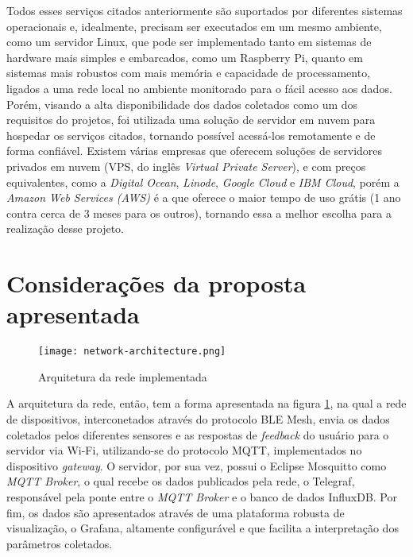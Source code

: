 \documentclass[../monografia.tex]{subfiles}
\begin{document}

Todos esses serviços citados anteriormente são suportados por diferentes sistemas operacionais e, idealmente, precisam ser executados em um mesmo ambiente, como um servidor Linux, que pode ser implementado tanto em sistemas de hardware mais simples e embarcados, como um Raspberry Pi, quanto em sistemas mais robustos com mais memória e capacidade de processamento, ligados a uma rede local no ambiente monitorado para o fácil acesso aos dados. Porém, visando a alta disponibilidade dos dados coletados como um dos requisitos do projetos, foi utilizada uma solução de servidor em nuvem para hospedar os serviços citados, tornando possível acessá-los remotamente e de forma confiável. Existem várias empresas que oferecem soluções de servidores privados em nuvem (VPS, do inglês \textit{Virtual Private Server}), e com preços equivalentes, como a \textit{Digital Ocean}, \textit{Linode}, \textit{Google Cloud} e \textit{IBM Cloud}, porém a \textit{Amazon Web Services (AWS)} é a que oferece o maior tempo de uso grátis (1 ano contra cerca de 3 meses para os outros), tornando essa a melhor escolha para a realização desse projeto. 


\section{Considerações da proposta apresentada}

\begin{figure}[h!]
	\centering
	\texttt{[image: network-architecture.png]}
	\caption{Arquitetura da rede implementada}
	\label{fig:network-architecture}
\end{figure}

A arquitetura da rede, então, tem a forma apresentada na figura \ref{fig:network-architecture}, na qual a rede de dispositivos, interconetados através do protocolo BLE Mesh, envia os dados coletados pelos diferentes sensores e as respostas de \textit{feedback} do usuário para o servidor via Wi-Fi, utilizando-se do protocolo MQTT, implementados no dispositivo \textit{gateway}. O servidor, por sua vez, possui o Eclipse Mosquitto como \textit{MQTT Broker}, o qual recebe os dados publicados pela rede, o Telegraf, responsável pela ponte entre o \textit{MQTT Broker} e o banco de dados InfluxDB. Por fim, os dados são apresentados através de uma plataforma robusta de visualização, o Grafana, altamente configurável e que facilita a interpretação dos parâmetros coletados.
\end{document}
